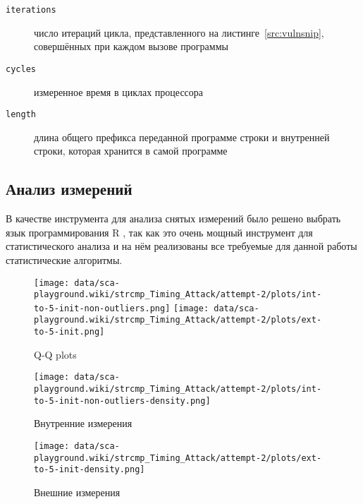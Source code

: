 \begin{description}
\item [\texttt{iterations}] число итераций цикла, представленного на
  листинге~\ref{src:vulnsnip}, совершённых при каждом вызове программы 
\item [\texttt{cycles}] измеренное время в циклах процессора
\item [\texttt{length}] длина общего префикса переданной программе  строки и
  внутренней строки, которая хранится в самой программе
\end{description}

\subsection{Анализ измерений}

В качестве инструмента для анализа снятых измерений было решено выбрать язык программирования
R \cite{r}, так как это очень мощный инструмент для статистического анализа и на нём реализованы
все требуемые для данной работы статистические алгоритмы.

    \begin{figure}
        \centering
        \texttt{[image: data/sca-playground.wiki/strcmp\_Timing\_Attack/attempt-2/plots/int-to-5-init-non-outliers.png]}
        \texttt{[image: data/sca-playground.wiki/strcmp\_Timing\_Attack/attempt-2/plots/ext-to-5-init.png]}
        \caption{Q-Q plots}
    \end{figure}

    \begin{figure}
        \centering
        \texttt{[image: data/sca-playground.wiki/strcmp\_Timing\_Attack/attempt-2/plots/int-to-5-init-non-outliers-density.png]}
        \caption{Внутренние измерения}
    \end{figure}

    \begin{figure}
        \centering
        \texttt{[image: data/sca-playground.wiki/strcmp\_Timing\_Attack/attempt-2/plots/ext-to-5-init-density.png]}
        \caption{Внешние измерения}
    \end{figure}

